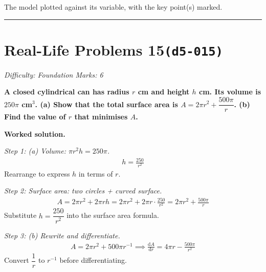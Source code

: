 \documentclass[11pt]{article}
\newcommand{\question}[1]{\par\medskip\noindent\textbf{#1}\par}
\begin{document}
\begin{center}
{
}
\end{center}
\small The model plotted against its variable, with the key point(s) marked.\normalsize

\medskip\hrule

\section*{Real-Life Problems 15\quad\small\texttt{(d5-015)}}
\textit{Difficulty: Foundation \quad\textbar\quad Marks: 6}

\question{A closed cylindrical can has radius \( r \) cm and height \( h \) cm. Its volume is \( 250\pi \) cm\(^3\). (a) Show that the total surface area is \( A = 2\pi r^2 + \dfrac{500\pi}{r} \). (b) Find the value of \( r \) that minimises \( A \).}

\textbf{Worked solution.}

\textit{Step 1: (a) Volume: \( \pi r^2 h = 250\pi \).}
\[\begin{gathered}
h = \frac{250}{r^2}
\end{gathered}\]
Rearrange to express \( h \) in terms of \( r \).

\textit{Step 2: Surface area: two circles + curved surface.}
\[\begin{gathered}
A = 2\pi r^2 + 2\pi r h = 2\pi r^2 + 2\pi r \cdot \frac{250}{r^2} = 2\pi r^2 + \frac{500\pi}{r}
\end{gathered}\]
Substitute \( h = \dfrac{250}{r^2} \) into the surface area formula.

\textit{Step 3: (b) Rewrite and differentiate.}
\[\begin{gathered}
A = 2\pi r^2 + 500\pi r^{-1} \implies \frac{\mathrm{d}A}{\mathrm{d}r} = 4\pi r - \frac{500\pi}{r^2}
\end{gathered}\]
Convert \( \dfrac{1}{r} \) to \( r^{-1} \) before differentiating.
\end{document}
